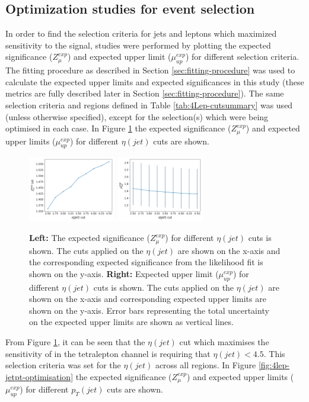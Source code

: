 \subsection{Optimization studies for event selection}
\label{sec:optimization-studies-tetra}
In order to find the selection criteria for jets and leptons which maximized sensitivity to the \tWZ signal, studies were performed by plotting the expected significance ($Z_{\mu}^{exp}$) and expected upper limit ($\mu_{up}^{exp}$) for different selection criteria. The fitting procedure as described in Section \ref{sec:fitting-procedure} was used to calculate the expected upper limits and expected significances in this study (these metrics are fully described later in Section \ref{sec:fitting-procedure}). The same selection criteria and regions defined in Table \ref{tab:4Lep-cutsummary} was used (unless otherwise specified), except for the selection(s) which were being optimised in each case. In Figure \ref{fig:4lep-jetEta-optimisation} the expected significance ($Z_{\mu}^{exp}$) and expected upper limits ($\mu_{up}^{exp}$) for different $\eta(jet)$ cuts are shown. 
\begin{figure}[h!]
	\includegraphics[width = 0.34\textwidth]{figures/signif_jetEta.png}
  	\includegraphics[width = 0.34\textwidth]{figures/exp_upper_jetEta.png}
  \centering
	\caption{\textbf{Left:} The expected significance ($Z_{\mu}^{exp}$) for different $\eta(jet)$ cuts is shown. The cuts applied on the $\eta(jet)$ are shown on the x-axis and the corresponding expected significance from the likelihood fit is shown on the y-axis. \textbf{Right:} Expected upper limit ($\mu_{up}^{exp}$) for different $\eta(jet)$ cuts is shown. The cuts applied on the $\eta(jet)$ are shown on the x-axis and corresponding expected upper limits are shown on the y-axis. Error bars representing the total uncertainty on the expected upper limits are shown as vertical lines.}
	\label{fig:4lep-jetEta-optimisation}
\end{figure}From Figure \ref{fig:4lep-jetEta-optimisation}, it can be seen that the $\eta(jet)$ cut which maximises the sensitivity of \tWZ in the tetralepton channel is requiring that $\eta(jet) < 4.5$. This selection criteria was set for the $\eta(jet)$ across all regions. In Figure \ref{fig:4lep-jetpt-optimisation} the expected significance ($Z_{\mu}^{exp}$) and expected upper limits ($\mu_{up}^{exp}$) for different $p_{T}(jet)$ cuts are shown.
